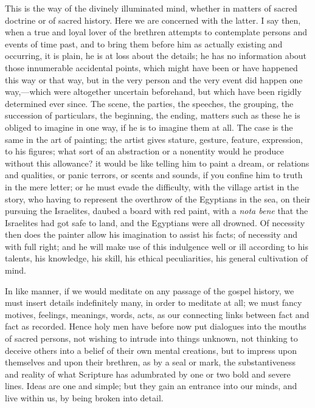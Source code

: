 This is the way of the divinely illuminated mind,
whether in matters of sacred doctrine or of sacred history. Here we
are concerned with the latter. I say then, when a true and loyal lover
of the brethren attempts to contemplate persons and events of time
past, and to bring them before him as actually existing and occurring,
it is plain, he is at loss about the details; he has no information
about those innumerable accidental points, which might have been or
have happened this way or that way, but in the very person and the
very event did happen one way,—which were altogether uncertain
beforehand, but which have been rigidly determined ever since. The
scene, the parties, the speeches, the grouping, the succession of
particulars, the beginning, the ending, matters such as these he is
obliged to imagine in one way, if he is to imagine them at all. The
case is the same in the art of painting; the artist gives stature,
gesture, feature, expression, to his figures; what sort of an
abstraction or a nonentity would he produce without this allowance? it
would be like telling him to paint a dream, or relations and
qualities, or panic terrors, or scents and sounds, if you confine him
to truth in the mere letter; or he must evade the difficulty, with the
village artist in the story, who having to represent the overthrow of
the Egyptians in the sea, on their pursuing the Israelites, daubed a
board with red paint, with a \emph{nota bene} that the Israelites had
got safe to land, and the Egyptians were all drowned. Of necessity
then does the painter allow his imagination to assist his facts; of
necessity and with full right; and he will make use of this indulgence
well or ill according to his talents, his knowledge, his skill, his
ethical peculiarities, his general cultivation of mind.

In like manner, if we would meditate on any
passage of the gospel history, we must insert details indefinitely
many, in order to meditate at all; we must fancy motives, feelings,
meanings, words, acts, as our connecting links between fact and fact
as recorded. Hence holy men have before now put dialogues into the
mouths of sacred persons, not wishing to intrude into things unknown,
not thinking to deceive others into a belief of their own mental
creations, but to impress upon themselves and upon their brethren, as
by a seal or mark, the substantiveness and reality of what Scripture
has adumbrated by one or two bold and severe lines. Ideas are one and
simple; but they gain an entrance into our minds, and live within us,
by being broken into detail.

